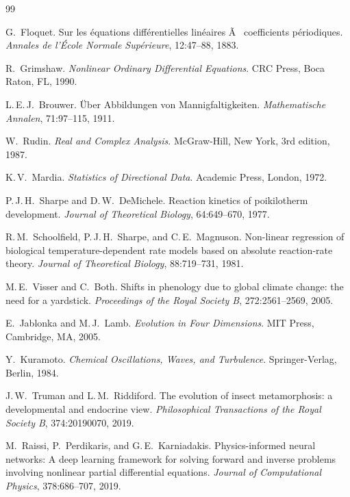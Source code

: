 ﻿\documentclass[12pt, a4paper]{article}
\theoremstyle{definition}
\begin{document}
\begin{thebibliography}{99}
 
G.~Floquet.
\newblock Sur les équations différentielles linéaires Ã  coefficients
  périodiques.
\newblock \emph{Annales de l'École Normale Supérieure}, 12:47--88, 1883.
 
R.~Grimshaw.
\newblock \emph{Nonlinear Ordinary Differential Equations}.
\newblock CRC Press, Boca Raton, FL, 1990.
 
L.\,E.\,J.~Brouwer.
\newblock Über Abbildungen von Mannigfaltigkeiten.
\newblock \emph{Mathematische Annalen}, 71:97--115, 1911.
 
W.~Rudin.
\newblock \emph{Real and Complex Analysis}.
\newblock McGraw-Hill, New York, 3rd edition, 1987.
 
K.\,V.~Mardia.
\newblock \emph{Statistics of Directional Data}.
\newblock Academic Press, London, 1972.
 
P.\,J.\,H.~Sharpe and D.\,W.~DeMichele.
\newblock Reaction kinetics of poikilotherm development.
\newblock \emph{Journal of Theoretical Biology}, 64:649--670, 1977.
 
R.\,M.~Schoolfield, P.\,J.\,H.~Sharpe, and C.\,E.~Magnuson.
\newblock Non-linear regression of biological temperature-dependent rate models
  based on absolute reaction-rate theory.
\newblock \emph{Journal of Theoretical Biology}, 88:719--731, 1981.
 
M.\,E.~Visser and C.~Both.
\newblock Shifts in phenology due to global climate change: the need for a
  yardstick.
\newblock \emph{Proceedings of the Royal Society B}, 272:2561--2569, 2005.
 
E.~Jablonka and M.\,J.~Lamb.
\newblock \emph{Evolution in Four Dimensions}.
\newblock MIT Press, Cambridge, MA, 2005.
 
Y.~Kuramoto.
\newblock \emph{Chemical Oscillations, Waves, and Turbulence}.
\newblock Springer-Verlag, Berlin, 1984.
 
J.\,W.~Truman and L.\,M.~Riddiford.
\newblock The evolution of insect metamorphosis: a developmental and endocrine
  view.
\newblock \emph{Philosophical Transactions of the Royal Society B}, 374:20190070,
  2019.
 
M.~Raissi, P.~Perdikaris, and G.\,E.~Karniadakis.
\newblock Physics-informed neural networks: A deep learning framework for solving
  forward and inverse problems involving nonlinear partial differential equations.
\newblock \emph{Journal of Computational Physics}, 378:686--707, 2019.
 

\end{thebibliography}
\end{document}

